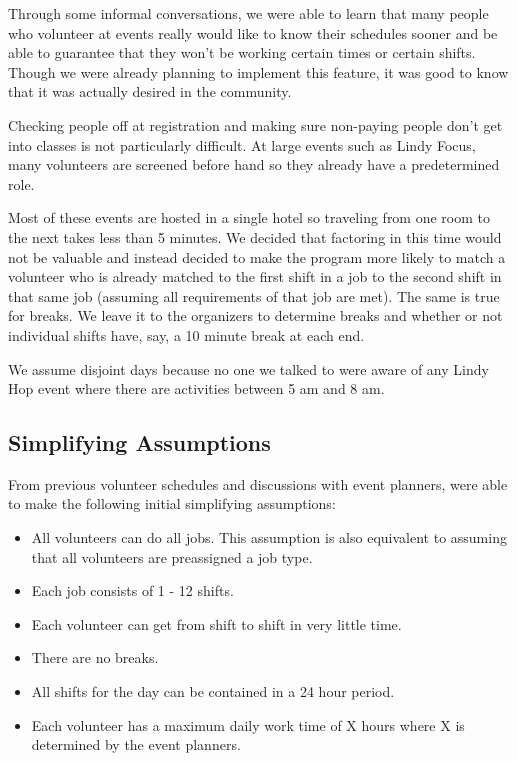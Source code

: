 \documentclass[11pt]{article}
\theoremstyle{definition}
\begin{document}
\begin{multicols}{2}
Through some informal conversations, we were able to learn that many people who volunteer at events really would like to know their schedules sooner and be able to guarantee that they won't be working certain times or certain shifts.
Though we were already planning to implement this feature, it was good to know that it was actually desired in the community.

Checking people off at registration and making sure non-paying people don't get into classes is not particularly difficult.
At large events such as Lindy Focus, many volunteers are screened before hand so they already have a predetermined role.

Most of these events are hosted in a single hotel so traveling from one room to the next takes less than 5 minutes.
We decided that factoring in this time would not be valuable and instead decided to make the program more likely to match a volunteer who is already matched to the first shift in a job to the second shift in that same job (assuming all requirements of that job are met).
The same is true for breaks.
We leave it to the organizers to determine breaks and whether or not individual shifts have, say, a 10 minute break at each end.

We assume disjoint days because no one we talked to were aware of any Lindy Hop event where there are activities between 5 am and 8 am.

\subsection{Simplifying Assumptions}
From previous volunteer schedules and discussions with event planners, were able to make the following initial simplifying assumptions:
\begin{itemize}\itemsep0pt
\item All volunteers can do all jobs. This assumption is also equivalent to assuming that all volunteers are preassigned a job type.
\item Each job consists of 1 - 12 shifts.
\item Each volunteer can get from shift to shift in very little time.
\item There are no breaks.
\item All shifts for the day can be contained in a 24 hour period.
\item Each volunteer has a maximum daily work time of X hours where X is determined by the event planners.
\end{itemize}
%
%

\end{multicols}
\end{document}
